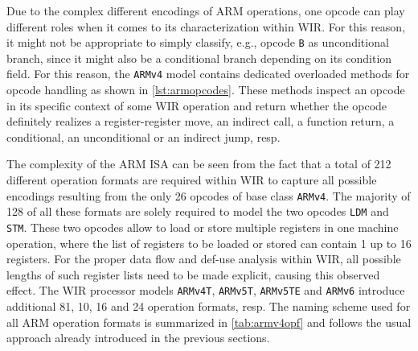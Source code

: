 Due to the complex different encodings of ARM operations, one opcode can play different roles when it comes to its characterization within \gls{WIR}.
For this reason, it might not be appropriate to simply classify, e.g., opcode \texttt{B} as unconditional branch, since it might also be a conditional branch depending on its condition field.
For this reason, the \texttt{ARMv4} model contains dedicated overloaded methods for opcode handling as shown in \cref{lst:armopcodes}.
These methods inspect an opcode in its specific context of some \gls{WIR} operation and return whether the opcode definitely realizes a register-register move, an indirect call, a function return, a conditional, an unconditional or an indirect jump, resp.

The complexity of the ARM \gls{ISA} can be seen from the fact that a total of 212 different operation formats are required within \gls{WIR} to capture all possible encodings resulting from the only 26 opcodes of base class \texttt{ARMv4}.
The majority of 128 of all these formats are solely required to model the two opcodes \texttt{LDM} and \texttt{STM}.
These two opcodes allow to load or store multiple registers in one machine operation, where the list of registers to be loaded or stored can contain 1 up to 16 registers.
For the proper data flow and def-use analysis within \gls{WIR}, all possible lengths of such register lists need to be made explicit, causing this observed effect.
The \gls{WIR} processor models \texttt{ARMv4T}, \texttt{ARMv5T}, \texttt{ARMv5TE} and \texttt{ARMv6} introduce additional 81, 10, 16 and 24 operation formats, resp.
The naming scheme used for all ARM operation formats is summarized in \cref{tab:armv4opf} and follows the usual approach already introduced in the previous sections.

